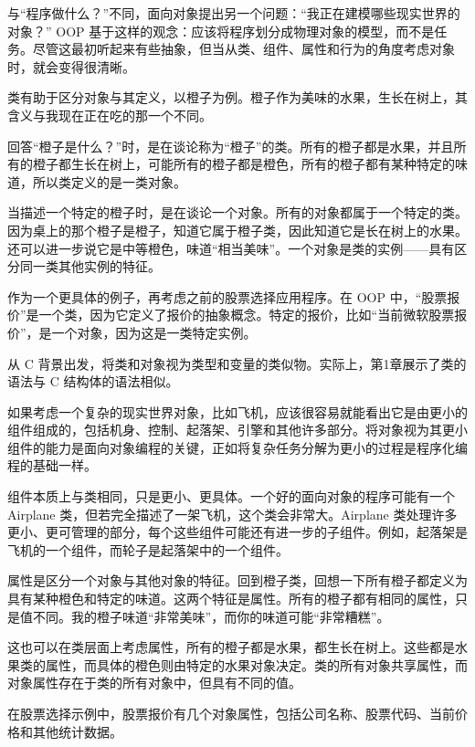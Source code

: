 
与“程序做什么？”不同，面向对象提出另一个问题：“我正在建模哪些现实世界的对象？” OOP 基于这样的观念：应该将程序划分成物理对象的模型，而不是任务。尽管这最初听起来有些抽象，但当从类、组件、属性和行为的角度考虑对象时，就会变得很清晰。


类有助于区分对象与其定义，以橙子为例。橙子作为美味的水果，生长在树上，其含义与我现在正在吃的那一个不同。

回答“橙子是什么？”时，是在谈论称为“橙子”的类。所有的橙子都是水果，并且所有的橙子都生长在树上，可能所有的橙子都是橙色，所有的橙子都有某种特定的味道，所以类定义的是一类对象。

当描述一个特定的橙子时，是在谈论一个对象。所有的对象都属于一个特定的类。因为桌上的那个橙子是橙子，知道它属于橙子类，因此知道它是长在树上的水果。还可以进一步说它是中等橙色，味道“相当美味”。一个对象是类的实例——具有区分同一类其他实例的特征。

作为一个更具体的例子，再考虑之前的股票选择应用程序。在 OOP 中，“股票报价”是一个类，因为它定义了报价的抽象概念。特定的报价，比如“当前微软股票报价”，是一个对象，因为这是一类特定实例。

从 C 背景出发，将类和对象视为类型和变量的类似物。实际上，第1章展示了类的语法与 C 结构体的语法相似。


如果考虑一个复杂的现实世界对象，比如飞机，应该很容易就能看出它是由更小的组件组成的，包括机身、控制、起落架、引擎和其他许多部分。将对象视为其更小组件的能力是面向对象编程的关键，正如将复杂任务分解为更小的过程是程序化编程的基础一样。

组件本质上与类相同，只是更小、更具体。一个好的面向对象的程序可能有一个 Airplane 类，但若完全描述了一架飞机，这个类会非常大。Airplane 类处理许多更小、更可管理的部分，每个这些组件可能还有进一步的子组件。例如，起落架是飞机的一个组件，而轮子是起落架中的一个组件。


属性是区分一个对象与其他对象的特征。回到橙子类，回想一下所有橙子都定义为具有某种橙色和特定的味道。这两个特征是属性。所有的橙子都有相同的属性，只是值不同。我的橙子味道“非常美味”，而你的味道可能“非常糟糕”。

这也可以在类层面上考虑属性，所有的橙子都是水果，都生长在树上。这些都是水果类的属性，而具体的橙色则由特定的水果对象决定。类的所有对象共享属性，而对象属性存在于类的所有对象中，但具有不同的值。

在股票选择示例中，股票报价有几个对象属性，包括公司名称、股票代码、当前价格和其他统计数据。

